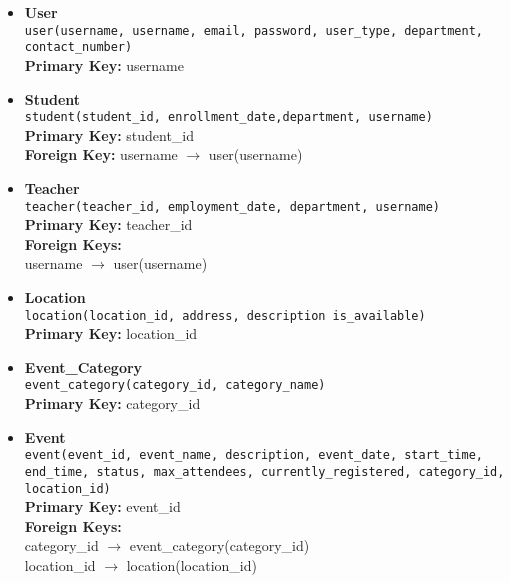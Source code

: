 \begin{itemize}
    \item \textbf{User} \\
        \texttt{user(username, username, email, password, user\_type, department, contact\_number)} \\
        \textbf{Primary Key:} username \\

    \item \textbf{Student} \\
        \texttt{student(student\_id, enrollment\_date,department, username)} \\
        \textbf{Primary Key:} student\_id \\
        \textbf{Foreign Key:} username $\rightarrow$ user(username)
    
    \item \textbf{Teacher} \\
        \texttt{teacher(teacher\_id, employment\_date, department, username)} \\
        \textbf{Primary Key:} teacher\_id \\
        \textbf{Foreign Keys:} \\
        \hspace*{1cm} username $\rightarrow$ user(username)
        
    \item \textbf{Location} \\
        \texttt{location(location\_id, address, description is\_available)} \\
        \textbf{Primary Key:} location\_id
        
    \item \textbf{Event\_Category} \\
        \texttt{event\_category(category\_id, category\_name)} \\
        \textbf{Primary Key:} category\_id
        
    \item \textbf{Event} \\
        \texttt{event(event\_id, event\_name, description, event\_date, start\_time, end\_time, status, max\_attendees, currently\_registered, category\_id, location\_id)} \\
        \textbf{Primary Key:} event\_id \\
        \textbf{Foreign Keys:} \\
        \hspace*{1cm} category\_id $\rightarrow$ event\_category(category\_id) \\
        \hspace*{1cm} location\_id $\rightarrow$ location(location\_id)
        

\end{itemize}
